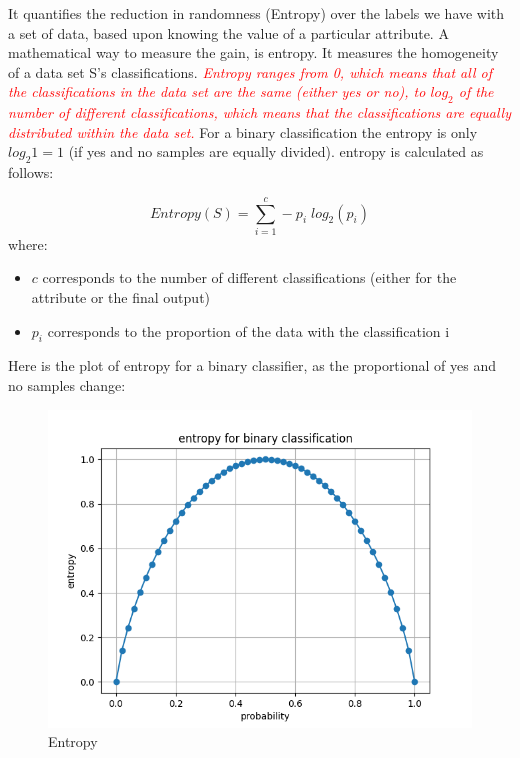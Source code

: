 \documentclass[12pt]{report}
\begin{document}
It quantifies the reduction in randomness (Entropy) over the labels we have with a set of data, based upon knowing the value of a particular attribute. A mathematical way to measure the gain, is entropy. It measures the homogeneity of a data set S's  classifications. \textcolor{red}{\textit{Entropy ranges from 0, which means that all of the classifications in the data set are the same (either yes or no), to $log_{2}$ of the number of different classifications, which means that the classifications are equally distributed within the data set.}} For a binary classification the entropy is only $log_{2} 1 = 1$ (if yes and no samples are equally divided). entropy is calculated as follows:

\begin{equation}
Entropy(S) = \sum_{i=1}^{c} -p_{i} \; log_{2} (p_{i})
\end{equation}
where:
\begin{itemize}
\item $c$ corresponds to the number of different classifications (either for the attribute or the final output)
\item $p_{i}$ corresponds to the proportion of the data with the classification i
\end{itemize}

Here is the plot of entropy for a binary classifier, as the proportional of yes and no samples change:


\begin{figure}[H]
	\centering
	\caption{Entropy}
	\includegraphics[scale=0.5]{pics/entroy.png}
\end{figure}
\end{document}

